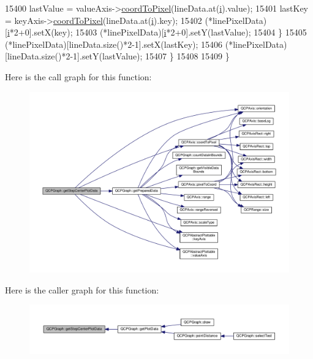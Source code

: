 \begin{DoxyCode}
15400       lastValue = valueAxis->\hyperlink{class_q_c_p_axis_a985ae693b842fb0422b4390fe36d299a}{coordToPixel}(lineData.at(\hyperlink{_comparision_pictures_2_createtest_image_8m_a6f6ccfcf58b31cb6412107d9d5281426}{i}).value);
15401       lastKey = keyAxis->\hyperlink{class_q_c_p_axis_a985ae693b842fb0422b4390fe36d299a}{coordToPixel}(lineData.at(\hyperlink{_comparision_pictures_2_createtest_image_8m_a6f6ccfcf58b31cb6412107d9d5281426}{i}).key);
15402       (*linePixelData)[\hyperlink{_comparision_pictures_2_createtest_image_8m_a6f6ccfcf58b31cb6412107d9d5281426}{i}*2+0].setX(key);
15403       (*linePixelData)[\hyperlink{_comparision_pictures_2_createtest_image_8m_a6f6ccfcf58b31cb6412107d9d5281426}{i}*2+0].setY(lastValue);
15404     \}
15405     (*linePixelData)[lineData.size()*2-1].setX(lastKey);
15406     (*linePixelData)[lineData.size()*2-1].setY(lastValue);
15407   \}
15408 
15409 \}
\end{DoxyCode}


Here is the call graph for this function\+:\nopagebreak
\begin{figure}[H]
\begin{center}
\leavevmode
\includegraphics[width=350pt]{class_q_c_p_graph_ad3713e7d8eb85a0afc34a81a5db5cd27_cgraph}
\end{center}
\end{figure}




Here is the caller graph for this function\+:\nopagebreak
\begin{figure}[H]
\begin{center}
\leavevmode
\includegraphics[width=350pt]{class_q_c_p_graph_ad3713e7d8eb85a0afc34a81a5db5cd27_icgraph}
\end{center}
\end{figure}


